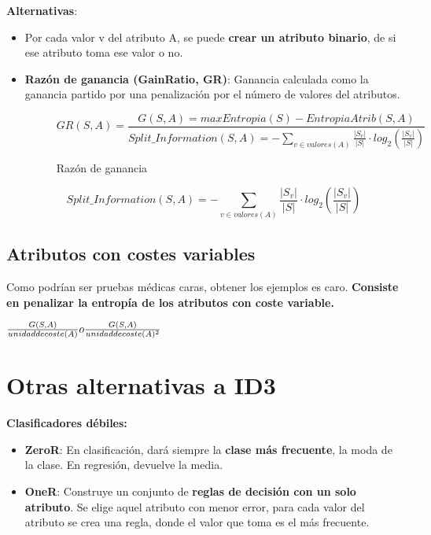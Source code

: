 \documentclass[12pt]{report} %
\begin{document}
\textbf{Alternativas}:

\begin{itemize}

\item
  Por cada valor v del atributo A, se puede \textbf{crear un atributo binario},
  de si ese atributo toma ese valor o no.
\item \textbf{Razón de ganancia (GainRatio, GR)}: Ganancia calculada como la
  ganancia partido por una penalización por el número de valores del
  atributos.
  \begin{figure}[H]
    $$
    GR(S,A)= \frac {G(S,A)=max Entropia(S)-EntropiaAtrib(S,A)}{Split\_Information(S,A)=-\sum_{v\in valores(A)} \frac {|S_v|}{|S|} \cdot log_2(\frac {|S_v|}{|S|})}
    $$
    \captionsetup{justification=centering}
    \caption{Razón de ganancia}
  \end{figure}
  $$
  Split\_Information(S,A)=-\sum_{v\in valores(A)} \frac {|S_v|}{|S|} \cdot log_2(\frac {|S_v|}{|S|}) 
  $$
\end{itemize}

\subsection{Atributos con costes
variables}

Como podrían ser pruebas médicas caras, obtener los ejemplos es caro.
\textbf{Consiste en penalizar la entropía de los atributos con coste
variable.}

\(\frac {G(S,A)}{unidad \space de \space coste(A)} o \frac {G(S,A)}{unidad \space de \space coste(A)^2}\)

\section{Otras alternativas a ID3}

\textbf{Clasificadores débiles:}

\begin{itemize}

\item
  \textbf{ZeroR}: En clasificación, dará siempre la \textbf{clase más
  frecuente}, la moda de la clase. En regresión, devuelve la media.
\item
  \textbf{OneR}: Construye un conjunto de \textbf{reglas de decisión con
  un solo atributo}. Se elige aquel atributo con menor error, para cada
  valor del atributo se crea una regla, donde el valor que toma es el
  más frecuente.
\end{itemize}
\end{document}
